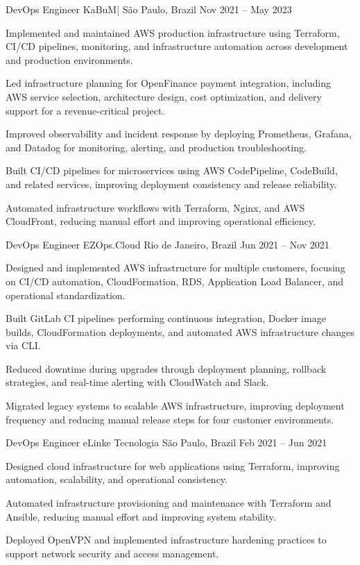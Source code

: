 \experience
  {DevOps Engineer}
  {KaBuM|}
  {S\~{a}o Paulo, Brazil}
  {Nov 2021 -- May 2023}
  {
    \item Implemented and maintained AWS production infrastructure using Terraform, CI/CD pipelines, monitoring, and infrastructure automation across development and production environments.
    \item Led infrastructure planning for OpenFinance payment integration, including AWS service selection, architecture design, cost optimization, and delivery support for a revenue-critical project.
    \item Improved observability and incident response by deploying Prometheus, Grafana, and Datadog for monitoring, alerting, and production troubleshooting.
    \item Built CI/CD pipelines for microservices using AWS CodePipeline, CodeBuild, and related services, improving deployment consistency and release reliability.
    \item Automated infrastructure workflows with Terraform, Nginx, and AWS CloudFront, reducing manual effort and improving operational efficiency.
  }

\experience
  {DevOps Engineer}
  {EZOps.Cloud}
  {Rio de Janeiro, Brazil}
  {Jun 2021 -- Nov 2021}
  {
    \item Designed and implemented AWS infrastructure for multiple customers, focusing on CI/CD automation, CloudFormation, RDS, Application Load Balancer, and operational standardization.
    \item Built GitLab CI pipelines performing continuous integration, Docker image builds, CloudFormation deployments, and automated AWS infrastructure changes via CLI.
    \item Reduced downtime during upgrades through deployment planning, rollback strategies, and real-time alerting with CloudWatch and Slack.
    \item Migrated legacy systems to scalable AWS infrastructure, improving deployment frequency and reducing manual release steps for four customer environments.
  }

\experience
  {DevOps Engineer}
  {eLinke Tecnologia}
  {S\~{a}o Paulo, Brazil}
  {Feb 2021 -- Jun 2021}
  {
    \item Designed cloud infrastructure for web applications using Terraform, improving automation, scalability, and operational consistency.
    \item Automated infrastructure provisioning and maintenance with Terraform and Ansible, reducing manual effort and improving system stability.
    \item Deployed OpenVPN and implemented infrastructure hardening practices to support network security and access management.
  }
